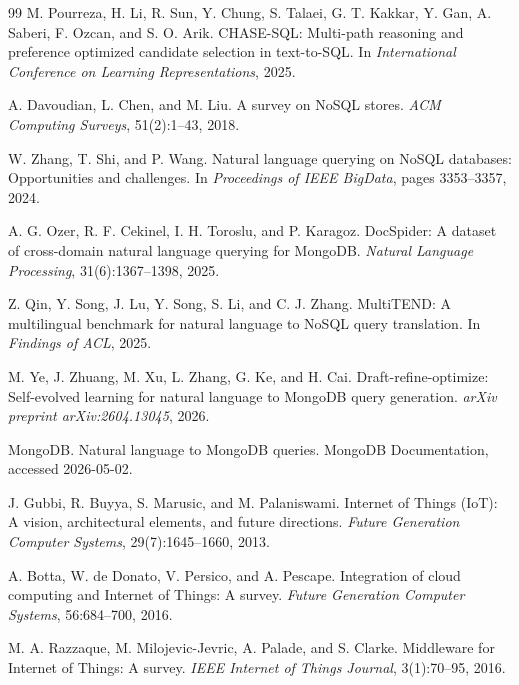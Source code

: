 \documentclass[11pt]{article}
\begin{document}
\begin{thebibliography}{99}
M. Pourreza, H. Li, R. Sun, Y. Chung, S. Talaei, G. T. Kakkar, Y. Gan, A. Saberi, F. Ozcan, and S. O. Arik.
CHASE-SQL: Multi-path reasoning and preference optimized candidate selection in text-to-SQL.
In \emph{International Conference on Learning Representations}, 2025.

A. Davoudian, L. Chen, and M. Liu.
A survey on NoSQL stores.
\emph{ACM Computing Surveys}, 51(2):1--43, 2018.

W. Zhang, T. Shi, and P. Wang.
Natural language querying on NoSQL databases: Opportunities and challenges.
In \emph{Proceedings of IEEE BigData}, pages 3353--3357, 2024.

A. G. Ozer, R. F. Cekinel, I. H. Toroslu, and P. Karagoz.
DocSpider: A dataset of cross-domain natural language querying for MongoDB.
\emph{Natural Language Processing}, 31(6):1367--1398, 2025.

Z. Qin, Y. Song, J. Lu, Y. Song, S. Li, and C. J. Zhang.
MultiTEND: A multilingual benchmark for natural language to NoSQL query translation.
In \emph{Findings of ACL}, 2025.

M. Ye, J. Zhuang, M. Xu, L. Zhang, G. Ke, and H. Cai.
Draft-refine-optimize: Self-evolved learning for natural language to MongoDB query generation.
\emph{arXiv preprint arXiv:2604.13045}, 2026.

MongoDB.
Natural language to MongoDB queries.
MongoDB Documentation, accessed 2026-05-02.

J. Gubbi, R. Buyya, S. Marusic, and M. Palaniswami.
Internet of Things (IoT): A vision, architectural elements, and future directions.
\emph{Future Generation Computer Systems}, 29(7):1645--1660, 2013.

A. Botta, W. de Donato, V. Persico, and A. Pescape.
Integration of cloud computing and Internet of Things: A survey.
\emph{Future Generation Computer Systems}, 56:684--700, 2016.

M. A. Razzaque, M. Milojevic-Jevric, A. Palade, and S. Clarke.
Middleware for Internet of Things: A survey.
\emph{IEEE Internet of Things Journal}, 3(1):70--95, 2016.

\end{thebibliography}
\end{document}
